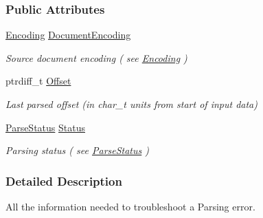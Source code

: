 \subsubsection*{Public Attributes}
\begin{DoxyCompactItemize}
\item 
\hypertarget{structMezzanine_1_1xml_1_1ParseResult_a849461f2858efe345b67c826b3d2730f}{
\hyperlink{namespaceMezzanine_1_1xml_ab1e7e96991b9c08ac13e797a15253804}{Encoding} \hyperlink{structMezzanine_1_1xml_1_1ParseResult_a849461f2858efe345b67c826b3d2730f}{DocumentEncoding}}
\label{structMezzanine_1_1xml_1_1ParseResult_a849461f2858efe345b67c826b3d2730f}

\begin{DoxyCompactList}\small\item\em Source document encoding ( see \hyperlink{namespaceMezzanine_1_1xml_ab1e7e96991b9c08ac13e797a15253804}{Encoding} ) \item\end{DoxyCompactList}\item 
\hypertarget{structMezzanine_1_1xml_1_1ParseResult_a205a0531fa1f6354667293911384dd14}{
ptrdiff\_\-t \hyperlink{structMezzanine_1_1xml_1_1ParseResult_a205a0531fa1f6354667293911384dd14}{Offset}}
\label{structMezzanine_1_1xml_1_1ParseResult_a205a0531fa1f6354667293911384dd14}

\begin{DoxyCompactList}\small\item\em Last parsed offset (in char\_\-t units from start of input data) \item\end{DoxyCompactList}\item 
\hypertarget{structMezzanine_1_1xml_1_1ParseResult_a00e5bb8ce5cc4a7b8219cf648681d882}{
\hyperlink{namespaceMezzanine_1_1xml_a119489767bc2293563aef2066d960796}{ParseStatus} \hyperlink{structMezzanine_1_1xml_1_1ParseResult_a00e5bb8ce5cc4a7b8219cf648681d882}{Status}}
\label{structMezzanine_1_1xml_1_1ParseResult_a00e5bb8ce5cc4a7b8219cf648681d882}

\begin{DoxyCompactList}\small\item\em Parsing status ( see \hyperlink{namespaceMezzanine_1_1xml_a119489767bc2293563aef2066d960796}{ParseStatus} ) \item\end{DoxyCompactList}\end{DoxyCompactItemize}


\subsubsection{Detailed Description}
All the information needed to troubleshoot a Parsing error. 

